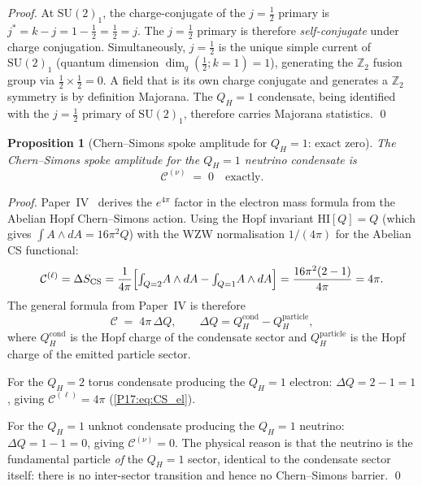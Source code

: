 \documentclass[11pt,a4paper]{article}
\newtheorem{proposition}[theorem]{Proposition}
\theoremstyle{definition}\newtheorem{definition}[theorem]{Definition}
\theoremstyle{remark}
\newcommand{\QH}{Q_H}
\newcommand{\Ztwo}{\mathbb{Z}_2}
\begin{document}
\begin{proof}
At $\mathrm{SU}(2)_1$, the charge-conjugate of the $j=\tfrac12$
primary is $j^* = k - j = 1 - \tfrac12 = \tfrac12 = j$.
The $j=\tfrac12$ primary is therefore \emph{self-conjugate} under
charge conjugation.  Simultaneously, $j=\tfrac12$ is the unique simple
current of $\mathrm{SU}(2)_1$ (quantum dimension $\dim_q(\tfrac12;k{=}1)=1$),
generating the $\Ztwo$ fusion group via $\tfrac12\times\tfrac12=0$.
A field that is its own charge conjugate and generates a $\Ztwo$
symmetry is by definition Majorana.  The $\QH=1$ condensate,
being identified with the $j=\tfrac12$ primary of
$\mathrm{SU}(2)_1$, therefore carries Majorana statistics.
\qed
\end{proof}

\begin{proposition}[Chern--Simons spoke amplitude for $\QH=1$: exact zero]
\label{P17:prop:CS_spoke}
The Chern--Simons spoke amplitude for the $\QH=1$ neutrino condensate is
\begin{equation}
  \mathcal{C}^{(\nu)} \;=\; 0 \quad \text{exactly.}
  \label{P17:eq:CS_nu_zero}
\end{equation}
\end{proposition}

\begin{proof}
Paper~IV~\cite{Paper4} derives the $e^{4\pi}$ factor in the electron
mass formula from the Abelian Hopf Chern--Simons action.  Using the
Hopf invariant $\mathrm{HI}[Q]=Q$ (which gives $\int A\wedge dA=16\pi^2 Q$)
with the WZW normalisation $1/(4\pi)$ for the Abelian CS functional:
\begin{equation}
  \mathcal{C}^{(\ell)}
  = \Delta S_{\mathrm{CS}}
  = \frac{1}{4\pi}\Bigl[
      {\textstyle\int_{Q=2}} A\wedge dA
      - {\textstyle\int_{Q=1}} A\wedge dA
    \Bigr]
  = \frac{16\pi^2(2-1)}{4\pi}
  = 4\pi.
  \label{P17:eq:CS_el}
\end{equation}
The general formula from Paper~IV is therefore
\begin{equation}
  \mathcal{C} \;=\; 4\pi\,\Delta Q,
  \qquad
  \Delta Q = Q_H^{\mathrm{cond}} - Q_H^{\mathrm{particle}},
  \label{P17:eq:CS_general}
\end{equation}
where $Q_H^{\mathrm{cond}}$ is the Hopf charge of the condensate
sector and $Q_H^{\mathrm{particle}}$ is the Hopf charge of the
emitted particle sector.

For the $\QH=2$ torus condensate producing the $\QH=1$ electron:
$\Delta Q=2-1=1$, giving $\mathcal{C}^{(\ell)}=4\pi$ (\ref{P17:eq:CS_el}).

For the $\QH=1$ unknot condensate producing the $\QH=1$ neutrino:
$\Delta Q=1-1=0$, giving $\mathcal{C}^{(\nu)}=0$.
The physical reason is that the neutrino is the fundamental particle
\emph{of} the $\QH=1$ sector, identical to the condensate sector itself:
there is no inter-sector transition and hence no Chern--Simons barrier.
\qed
\end{proof}
\end{document}
